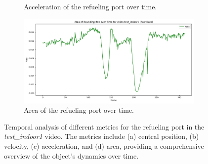 \documentclass[12pt,oneside]{book} %
\begin{document}
\begin{figure}[H]
\begin{subfigure}[t]{0.6\textwidth}
        \caption{Acceleration of the refueling port over time.}
        \label{fig:acceleration-test-indoor1}
    \end{subfigure}
    \hfill
    \begin{subfigure}[t]{0.6\textwidth}
        \includegraphics[width=\textwidth]{figures/bbox_metrics/test_indoor1 (Raw Data)_area.png}
        \caption{Area of the refueling port over time.}
        \label{fig:size-test-indoor1}
    \end{subfigure}
    \caption{Temporal analysis of different metrics for the refueling port in the \textit{test\_indoor1} video. The metrics include (a) central position, (b) velocity, (c) acceleration, and (d) area, providing a comprehensive overview of the object's dynamics over time.}
    \label{fig:bbox-metrics-test-indoor1}
\end{figure}
\end{document}
